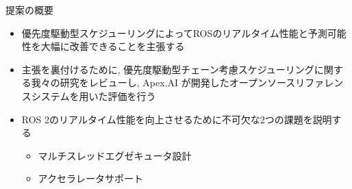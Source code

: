 

\begin{frame}{提案の概要}
    \begin{itemize}
        \item 優先度駆動型スケジューリングによってROSのリアルタイム性能と予測可能性を大幅に改善できることを主張する
        \item 主張を裏付けるために, 優先度駆動型チェーン考慮スケジューリングに関する我々の研究をレビューし, Apex.AI が開発したオープンソースリファレンスシステムを用いた評価を行う
        \item ROS 2のリアルタイム性能を向上させるために不可欠な2つの課題を説明する
        \begin{itemize}
            \item マルチスレッドエグゼキュータ設計
            \item アクセラレータサポート
        \end{itemize}
    \end{itemize}
\end{frame}
